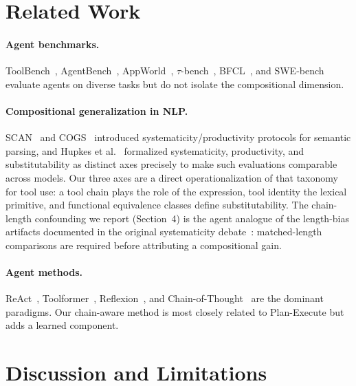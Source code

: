 ﻿\documentclass{article}
\begin{document}
\section{Related Work}
\label{sec:related}

\paragraph{Agent benchmarks.} ToolBench~\citep{qin2023toolllm}, AgentBench~\citep{liu2024agentbench}, AppWorld~\citep{trivedi2024appworld}, $\tau$-bench~\citep{yao2024tau}, BFCL~\citep{patil2024bfcl}, and SWE-bench~\citep{jimenez2024swe} evaluate agents on diverse tasks but do not isolate the compositional dimension.

\paragraph{Compositional generalization in NLP.} SCAN~\citep{lake2018generalization} and COGS~\citep{kim2020cogs} introduced systematicity/productivity protocols for semantic parsing, and Hupkes et al.~\citep{hupkes2020} formalized systematicity, productivity, and substitutability as distinct axes precisely to make such evaluations comparable across models. Our three axes are a direct operationalization of that taxonomy for tool use: a tool chain plays the role of the expression, tool identity the lexical primitive, and functional equivalence classes define substitutability. The chain-length confounding we report (Section~4) is the agent analogue of the length-bias artifacts documented in the original systematicity debate~\citep{lake2018generalization}: matched-length comparisons are required before attributing a compositional gain.

\paragraph{Agent methods.} ReAct~\citep{yao2023react}, Toolformer~\citep{schick2023toolformer}, Reflexion~\citep{shinn2023reflexion}, and Chain-of-Thought~\citep{wei2022chain} are the dominant paradigms. Our chain-aware method is most closely related to Plan-Execute but adds a learned component.

\section{Discussion and Limitations}
\label{sec:discussion}
\end{document}

